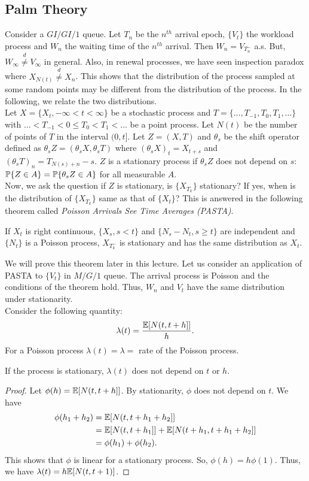 \documentclass[all-lectures.tex]{subfiles}
\begin{document}
\subsection{Palm Theory}
Consider a $GI/GI/1$ queue. Let $T_n$ be the $n^{th}$ arrival epoch, $\{V_t\}$ the workload process and $W_n$ the waiting time of the $n^{th}$ arrival. Then $W_n = V_{T_n^-}$ a.s. But, $W_\infty \stackrel{d}{\neq} V_\infty$ in general. Also, in renewal processes, we have seen inspection paradox where $X_{N(t)} \stackrel{d}{\neq} X_n$. This shows that the distribution of the process sampled at some random points may be different from the distribution of the process. In the following, we relate the two distributions.\\
\indent Let  $X = \{X_t, -\infty<t<\infty\}$ be a stochastic process and $T = \{\dots,T_{-1},T_{0},T_{1},\dots\}$ with $ \dots <T_{-1}<0\leq T_0 < T_1 < \dots $ be a point process. Let $N(t)$ be the number of points of $T$ in the interval $(0,t]$. Let $Z = (X,T)$ and $\theta_s$ be the shift operator defined as $\theta_s Z = (\theta_s X,\theta_s T)$ where $(\theta_s X)_t = X_{t+s}$ and $(\theta_s T)_n = T_{N(s)+ n} -s$. $Z$ is a stationary process if $\theta_s Z$ does not depend on $s$: $\P\{Z \in A\} = \P\{\theta_s Z \in A\}$ for all measurable $A$. \\
\indent Now, we ask the question if $Z$ is stationary, is $\{X_{T_k}\}$ stationary? If yes, when is the distribution of $\{X_{T_k}\}$ same as that of $\{X_t\}$? This is answered in the following theorem called \textit{Poisson Arrivals See Time Averages (PASTA)}. 
\begin{thm*}[PASTA]
If $X_t$ is right continuous, $\{X_s, s<t\}$ and $\{N_s - N_t, s\geq t\}$ are independent and $\{N_t\}$ is a Poisson process, $X_{T_k^-}$ is stationary and has the same distribution as $X_t$.
\end{thm*}
We will prove this theorem later in this lecture. Let us consider an application of PASTA to $\{V_t\}$ in $M/G/1$ queue. The arrival process is Poisson and the conditions of the theorem hold. Thus, $W_n$ and $V_t$ have the same distribution under stationarity. \\
\indent Consider the following quantity:
\begin{align*}
\lambda(t) = \frac{\E[N(t,t+h] ]}{h}.
\end{align*}
For a Poisson process $\lambda(t) = \lambda = $ rate of the Poisson process. 
\begin{prop}
If the process is stationary, $\lambda(t)$ does not depend on $t$ or $h$. 
\begin{proof}
Let $\phi(h) = \E[N(t,t+h] ]$. By stationarity, $\phi$ does not depend on $t$. We have 
\begin{align*}
\phi(h_1+h_2) &=  \E[N(t,t+h_1+h_2]] \\
&= \E[N(t,t+h_1]]  + \E[N(t+h_1,t+h_1+h_2]] \\
&= \phi(h_1) + \phi(h_2).
\end{align*}
This shows that $\phi$ is linear for a stationary process. So, $\phi(h) = h \phi(1)$. Thus, we have $\lambda(t) = h \E[N(t,t+1)]$.
\end{proof}
\end{prop}
\end{document}
